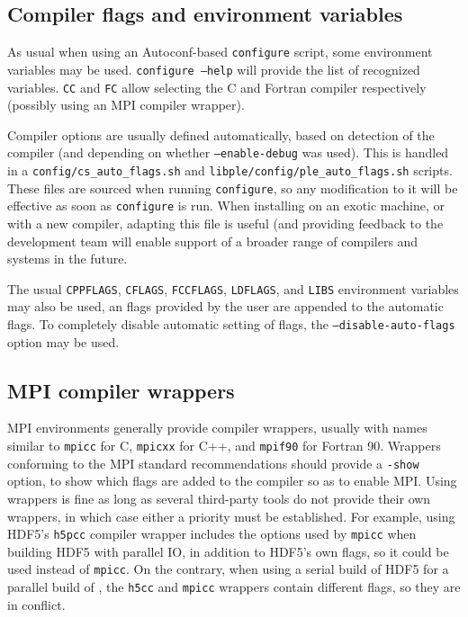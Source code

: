 \documentclass[a4paper,10pt,twoside]{csshortdoc}
\begin{document}
\subsection{Compiler flags and environment variables\label{sec:config:flags}}

As usual when using an Autoconf-based \texttt{configure} script,
some environment variables may be used. \texttt{configure --help}
will provide the list of recognized variables.
\texttt{CC} and \texttt{FC} allow selecting the C and Fortran compiler
respectively (possibly using an MPI compiler wrapper).

Compiler options are usually defined automatically, based on
detection of the compiler (and depending on whether \texttt{--enable-debug}
was used). This is handled in a \texttt{config/cs\_auto\_flags.sh}
and \texttt{libple/config/ple\_auto\_flags.sh} scripts.
These files are sourced when running \texttt{configure}, so
any modification to it will be effective as soon as \texttt{configure} is run.
When installing on an exotic machine, or with a new compiler, adapting this
file is useful (and providing feedback to the \CS development team
will enable support of a broader range of compilers and systems in the
future.

The usual \texttt{CPPFLAGS}, \texttt{CFLAGS},
\texttt{FCCFLAGS}, \texttt{LDFLAGS}, and \texttt{LIBS} environment variables
may also be used, an flags provided by the user are appended to the automatic
flags. To completely disable automatic setting of flags,
the \texttt{--disable-auto-flags} option may be used.

\subsection{MPI compiler wrappers\label{sec:config:mpicc}}

MPI environments generally provide compiler wrappers, usually
with names similar to \texttt{mpicc} for C, \texttt{mpicxx} for C++,
and \texttt{mpif90} for Fortran 90. Wrappers conforming to the
MPI standard recommendations should provide a \texttt{-show}
option, to show which flags are added to the compiler so as to
enable MPI. Using wrappers is fine as long as several third-party tools
do not provide their own wrappers, in which case either
a priority must be established. For example, using HDF5's
\texttt{h5pcc} compiler wrapper includes the options used by
\texttt{mpicc} when building HDF5 with parallel IO, in addition to
HDF5's own flags, so it could be used instead of \texttt{mpicc}.
On the contrary, when using a serial build of HDF5 for a parallel
build of \CS, the \texttt{h5cc} and \texttt{mpicc} wrappers
contain different flags, so they are in conflict.
\end{document}

